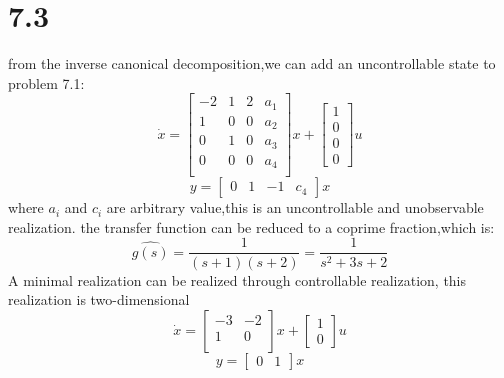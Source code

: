 \documentclass{article}
\begin{document}
\section*{7.3}
from the inverse canonical decomposition,we can add an uncontrollable state to problem 7.1:
\[
\dot{x}=
\left[
\begin{array}{cccc}
-2 & 1 & 2 & a_1\\
1 & 0 & 0 & a_2\\
0 & 1 & 0 & a_3\\
0 & 0 & 0 &a_4\\
\end{array}    
\right]x+
\left[
    \begin{array}{c}
    1\\
    0\\
    0\\
    0
    \end{array}
\right]u
\]
\[
    y=\left[
        \begin{array}{cccc}
            0 & 1 & -1 & c_4
        \end{array}
        \right]x    
\]
where $a_i$ and $c_i$ are arbitrary value,this is an uncontrollable and unobservable realization.
the transfer function can be reduced to a coprime fraction,which is:
\[
\hat{g(s)}=\frac{1}{(s+1)(s+2)}=\frac{1}{s^2+3s+2}    
\]
A minimal realization can be realized through controllable realization, this realization is two-dimensional
\[
\dot{x}=
\left[
\begin{array}{cc}
-3 & -2\\
1 & 0\\
\end{array}    
\right]x+
\left[
    \begin{array}{c}
    1\\
    0
    \end{array}
\right]u
\]
\[
    y=\left[
        \begin{array}{cc}
            0 & 1
        \end{array}
        \right]x    
\]
\end{document}
